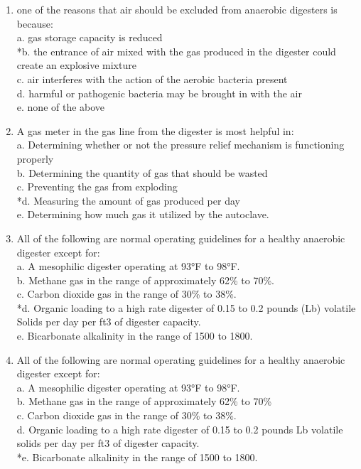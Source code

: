 \documentclass{article}
\begin{document}
\begin{enumerate}
\item  one of the reasons that air should be excluded from anaerobic digesters is because: \\

a. gas storage capacity is reduced \\
*b. the entrance of air mixed with the gas produced in the digester could create an explosive mixture \\
c. air interferes with the action of the aerobic bacteria present \\
d. harmful or pathogenic bacteria may be brought in with the air \\
e. none of the above \\

\item  A gas meter in the gas line from the digester is most helpful in: \\

a. Determining whether or not the pressure relief mechanism is functioning properly \\
b. Determining the quantity of gas that should be wasted \\
c. Preventing the gas from exploding \\
*d. Measuring the amount of gas produced per day \\
e. Determining how much gas it utilized by the autoclave. \\

\item  All of the following are normal operating guidelines for a healthy anaerobic digester except for: \\

a. A mesophilic digester operating at 93°F to 98°F. \\
b. Methane gas in the range of approximately 62\% to 70\%. \\
c. Carbon dioxide gas in the range of 30\% to 38\%. \\
*d. Organic loading to a high rate digester of 0.15 to 0.2 pounds (Lb) volatile Solids per day per ft3 of digester capacity. \\
e. Bicarbonate alkalinity in the range of 1500 to 1800. \\

\item  All of the following are normal operating guidelines for a healthy anaerobic digester except for: \\

a. A mesophilic digester operating at 93°F to 98°F. \\
b. Methane gas in the range of approximately 62\% to 70\% \\
c. Carbon dioxide gas in the range of 30\% to 38\%. \\
d. Organic loading to a high rate digester of 0.15 to 0.2 pounds Lb volatile solids per day per ft3 of digester capacity. \\
*e. Bicarbonate alkalinity in the range of 1500 to 1800. \\


\end{enumerate}
\end{document}

